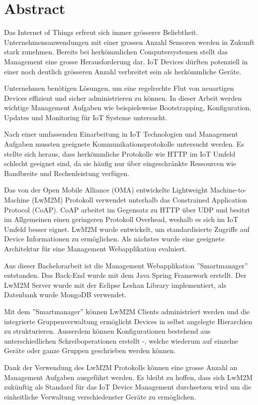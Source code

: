 \chapter*{Abstract}
Das Internet of Things erfreut sich immer grösserer Beliebtheit. Unternehmensanwendungen mit einer grossen Anzahl Sensoren werden in Zukunft stark zunehmen. Bereits bei herkömmlichen Computersystemen stellt das Management eine grosse Herausforderung dar. IoT Devices dürften potenziell in einer noch deutlich grösseren Anzahl verbreitet sein als herkömmliche Geräte. 

Unternehmen benötigen Lösungen, um eine regelrechte Flut von neuartigen Devices effizient und sicher administrieren zu können. In dieser Arbeit werden wichtige Management Aufgaben wie beispielsweise Bootstrapping, Konfiguration, Updates und Monitoring für IoT Systeme untersucht.

Nach einer umfassenden Einarbeitung in IoT Technologien und Management Aufgaben mussten geeignete Kommunikationsprotokolle untersucht werden. Es stellte sich heraus, dass herkömmliche Protokolle wie HTTP im IoT Umfeld schlecht geeignet sind, da sie häufig nur über eingeschränkte Ressourcen wie Bandbreite und Rechenleistung verfügen. 

Das von der Open Mobile Alliance (OMA) entwickelte Lightweight Machine-to-Machine (LwM2M) Protokoll verwendet unterhalb das Constrained Application Protocol (CoAP). CoAP arbeitet im Gegensatz zu HTTP über UDP und besitzt im Allgemeinen einen geringeren Protokoll Overhead, weshalb es sich im IoT Umfeld besser eignet. LwM2M wurde entwickelt, um standardisierte Zugriffe auf Device Informationen zu ermöglichen. Als nächstes wurde eine geeignete Architektur für eine Management Webapplikation evaluiert.

Aus dieser Bachelorarbeit ist die Management Webapplikation ''Smartmanager'' entstanden. Das Back-End wurde mit dem Java Spring Framework erstellt. Der LwM2M Server wurde mit der Eclipse Leshan Library implementiert, als Datenbank wurde MongoDB verwendet. 

Mit dem ''Smartmanager'' können LwM2M Clients administriert werden und die integrierte Gruppenverwaltung ermöglicht Devices in selbst angelegte Hierarchien zu strukturieren. Ausserdem können Konfigurationen bestehend aus unterschiedlichen Schreiboperationen erstellt -, welche wiederum auf einzelne Geräte oder ganze Gruppen geschrieben werden können. 

Dank der Verwendung des LwM2M Protokolls können eine grosse Anzahl an Management Aufgaben ausgeführt werden. Es bleibt zu hoffen, dass sich LwM2M zukünftig als Standard für das IoT Device Management durchsetzen wird um die einheitliche Verwaltung verschiedenster Geräte zu ermöglichen.
